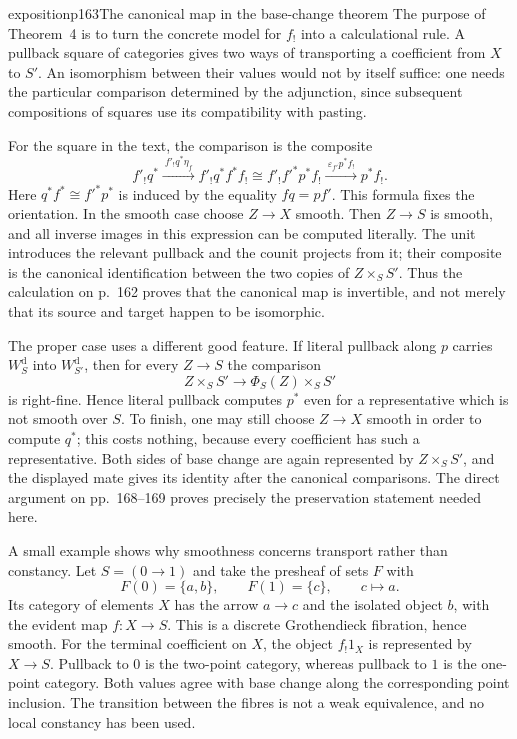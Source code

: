 \begin{dcomment}{exposition}{p163}{The canonical map in the base-change theorem}
The purpose of Theorem~4 is to turn the concrete model for $f_!$ into a calculational rule. A pullback square of categories gives two ways of transporting a coefficient from $X$ to $S'$. An isomorphism between their values would not by itself suffice: one needs the particular comparison determined by the adjunction, since subsequent compositions of squares use its compatibility with pasting.

For the square in the text, the comparison is the composite
\[
 f'_!q^*\xrightarrow{\ f'_!q^*\eta_f\ }
 f'_!q^*f^*f_!
 \cong f'_!f'^*p^*f_!
 \xrightarrow{\ \varepsilon_{f'}p^*f_!\ }p^*f_!.
\]
Here $q^*f^*\cong f'^*p^*$ is induced by the equality $fq=pf'$. This formula fixes the orientation. In the smooth case choose $Z\to X$ smooth. Then $Z\to S$ is smooth, and all inverse images in this expression can be computed literally. The unit introduces the relevant pullback and the counit projects from it; their composite is the canonical identification between the two copies of $Z\times_S S'$. Thus the calculation on p.~162 proves that the canonical map is invertible, and not merely that its source and target happen to be isomorphic.

The proper case uses a different good feature. If literal pullback along $p$ carries $W_S^{\mathrm d}$ into $W_{S'}^{\mathrm d}$, then for every $Z\to S$ the comparison
\[
 Z\times_S S'\longrightarrow \Phi_S(Z)\times_S S'
\]
is right-fine. Hence literal pullback computes $p^*$ even for a representative which is not smooth over $S$. To finish, one may still choose $Z\to X$ smooth in order to compute $q^*$; this costs nothing, because every coefficient has such a representative. Both sides of base change are again represented by $Z\times_S S'$, and the displayed mate gives its identity after the canonical comparisons. The direct argument on pp.~168--169 proves precisely the preservation statement needed here.

A small example shows why smoothness concerns transport rather than constancy. Let $S=(0\to1)$ and take the presheaf of sets $F$ with
\[
 F(0)=\{a,b\},\qquad F(1)=\{c\},\qquad c\longmapsto a.
\]
Its category of elements $X$ has the arrow $a\to c$ and the isolated object $b$, with the evident map $f:X\to S$. This is a discrete Grothendieck fibration, hence smooth. For the terminal coefficient on $X$, the object $f_!1_X$ is represented by $X\to S$. Pullback to $0$ is the two-point category, whereas pullback to $1$ is the one-point category. Both values agree with base change along the corresponding point inclusion. The transition between the fibres is not a weak equivalence, and no local constancy has been used.


\end{dcomment}
